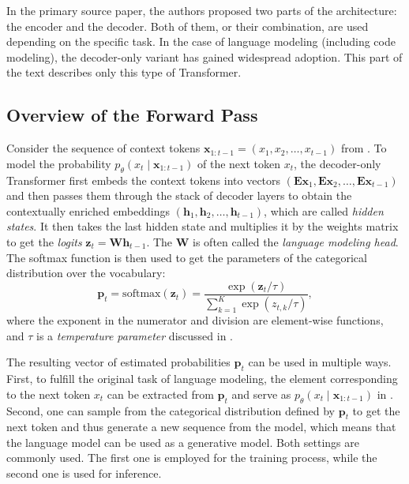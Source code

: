 In the primary source paper, the authors proposed two parts of the architecture: the encoder and the decoder. Both of them, or their combination, are used depending on the specific task. In the case of language modeling (including code modeling), the decoder-only variant has gained widespread adoption. This part of the text describes only this type of Transformer.

\subsection{Overview of the Forward Pass}

Consider the sequence of context tokens \(\bm{x}_{1:t-1} = (x_1, x_2, \ldots, x_{t-1})\) from . To model the probability \(p_{\theta}(x_t \mid \bm{x}_{1:t-1})\) of the next token \(x_t\), the decoder-only Transformer first embeds the context tokens into vectors \((\mathbf{Ex}_1, \mathbf{Ex}_2, \ldots, \mathbf{Ex}_{t-1})\) and then passes them through the stack of decoder layers to obtain the contextually enriched embeddings \((\mathbf{h}_1, \mathbf{h}_2, \ldots, \mathbf{h}_{t-1})\), which are called \textit{hidden states}. It then takes the last hidden state and multiplies it by the weights matrix to get the \textit{logits} \(\mathbf{z}_t = \mathbf{Wh}_{t-1}\). The \(\mathbf{W}\) is often called the \textit{language modeling head}. The softmax function is then used to get the parameters of the categorical distribution over the vocabulary:
\begin{equation}\label{eq:softmax}
    \mathbf{p}_t = \mathrm{softmax}(\mathbf{z}_t) = \frac{\exp(\mathbf{z}_t / \tau)}{\sum_{k=1}^{K} \exp(z_{t,k} / \tau)},
\end{equation}
where the exponent in the numerator and division are element-wise functions, and \(\tau\) is a \textit{temperature parameter} discussed in .

The resulting vector of estimated probabilities \(\mathbf{p}_t\) can be used in multiple ways. First, to fulfill the original task of language modeling, the element corresponding to the next token \(x_t\) can be extracted from \(\mathbf{p}_t\) and serve as \(p_{\theta}(x_t \mid \bm{x}_{1:t-1})\) in . Second, one can sample from the categorical distribution defined by \(\mathbf{p}_t\) to get the next token and thus generate a new sequence from the model, which means that the language model can be used as a generative model. Both settings are commonly used. The first one is employed for the training process, while the second one is used for inference.


